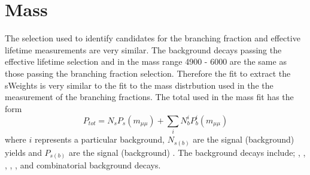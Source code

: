 
\section{Mass \pdfs}
\label{sec:ELmasspdfs}
The selection used to identify \bsmumu candidates for the \bmumu branching fraction and \bsmumu effective lifetime measurements are very similar. 
The background decays passing the \bsmumu effective lifetime selection and in the mass range 4900 - 6000 \mevcc are the same as those passing the branching fraction selection. Therefore the \ml fit to extract the sWeights is very similar to the fit to the mass distrbution used in the the measurement of the \bmumu branching fractions. The total \pdf used in the mass fit has the form
\begin{equation}
P_{tot} = N_{s}P_{s}(m_{\mu \mu}) + \displaystyle\sum_{i} N^i_{b}P^i_{b}(m_{\mu \mu})
\end{equation}
where $i$ represents a particular background, $N_{s(b)}$ are the signal (background) yields and $P_{s(b)}$ are the signal (background) \pdfs. The background decays include; \bdmumu, \lambdab, \bdpimunu, \bsKmunu, \bpimumu, \bcjpsimunu and combinatorial background decays. %


